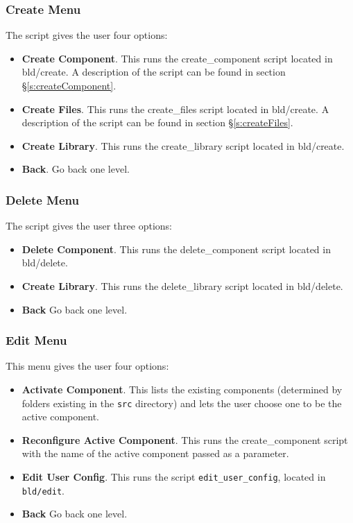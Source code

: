 \documentclass[a4paper, oneside, 11pt, titlepage, onecolumn, openright]{report}
\begin{document}
			
\subsubsection{Create Menu}
			\label{sss:VFstartCreateMenu}
			The script gives the user four options:
\begin{itemize}
\item \textbf{Create Component}. This runs the create\_component script located in bld/create. A description of the script can be found in section \S\ref{s:createComponent}.
\item \textbf{Create Files}. This runs the create\_files script located in bld/create. A description of the script can be found in section \S\ref{s:createFiles}.
\item \textbf{Create Library}. This runs the create\_library script located in bld/create.
\item \textbf{Back}. Go back one level.
\end{itemize}				
			


\subsubsection{Delete Menu}
			\label{sss:VFstartDeleteMenu}
			The script gives the user three options:
\begin{itemize}
\item \textbf{Delete Component}. This runs the delete\_component script located in bld/delete.
\item \textbf{Create Library}. This runs the delete\_library script located in bld/delete.
\item \textbf{Back} Go back one level.
\end{itemize}			


\subsubsection{Edit Menu}
			\label{sss:VFstartEditMenu}
			This menu gives the user four options:
\begin{itemize}
\item \textbf{Activate Component}. This lists the existing components (determined by folders existing in the \texttt{src} directory) and lets the user choose one to be the active component.
\item \textbf{Reconfigure Active Component}. This runs the create\_component script with the name of the active component passed as a parameter.
\item \textbf{Edit User Config}. This runs the script \texttt{edit\_user\_config}, located in \texttt{bld/edit}. 
\item \textbf{Back} Go back one level.
\end{itemize}					
\end{document}
